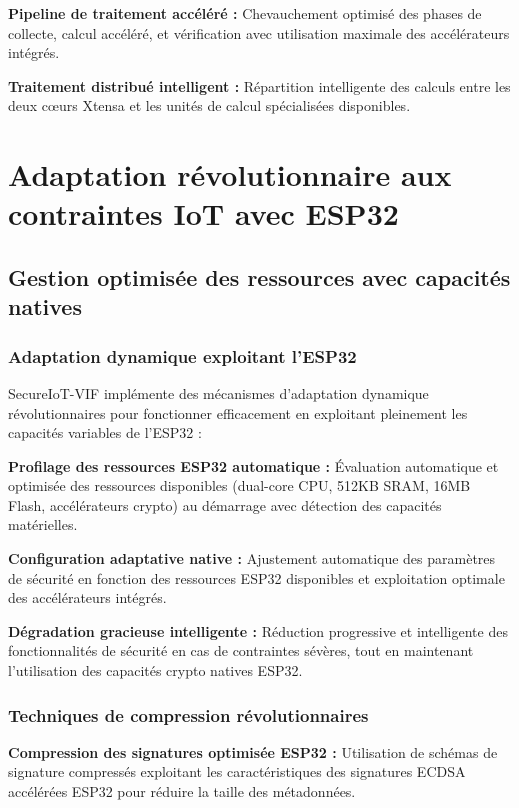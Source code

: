 \textbf{Pipeline de traitement accéléré :} Chevauchement optimisé des phases de collecte, calcul accéléré, et vérification avec utilisation maximale des accélérateurs intégrés.

\textbf{Traitement distribué intelligent :} Répartition intelligente des calculs entre les deux cœurs Xtensa et les unités de calcul spécialisées disponibles.

\section{Adaptation révolutionnaire aux contraintes IoT avec ESP32}

\subsection{Gestion optimisée des ressources avec capacités natives}

\subsubsection{Adaptation dynamique exploitant l'ESP32}

SecureIoT-VIF implémente des mécanismes d'adaptation dynamique révolutionnaires pour fonctionner efficacement en exploitant pleinement les capacités variables de l'ESP32 :

\textbf{Profilage des ressources ESP32 automatique :} Évaluation automatique et optimisée des ressources disponibles (dual-core CPU, 512KB SRAM, 16MB Flash, accélérateurs crypto) au démarrage avec détection des capacités matérielles.

\textbf{Configuration adaptative native :} Ajustement automatique des paramètres de sécurité en fonction des ressources ESP32 disponibles et exploitation optimale des accélérateurs intégrés.

\textbf{Dégradation gracieuse intelligente :} Réduction progressive et intelligente des fonctionnalités de sécurité en cas de contraintes sévères, tout en maintenant l'utilisation des capacités crypto natives ESP32.

\subsubsection{Techniques de compression révolutionnaires}

\textbf{Compression des signatures optimisée ESP32 :} Utilisation de schémas de signature compressés exploitant les caractéristiques des signatures ECDSA accélérées ESP32 pour réduire la taille des métadonnées.


